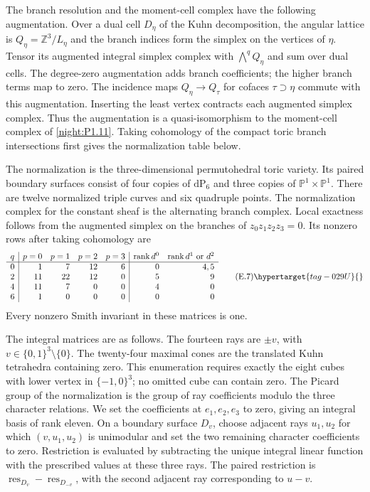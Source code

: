 \begin{remark}
\hypertarget{tag-PV08}{}\label{pub:V:cusp-branch-resolution}
The branch resolution and the moment-cell complex have the following
augmentation. Over a dual cell $D_\eta$ of the Kuhn decomposition,
the angular lattice is $Q_\eta=\mathbb Z^3/L_\eta$ and the branch
indices form the simplex on the vertices of $\eta$. Tensor its
augmented integral simplex complex with $\bigwedge^qQ_\eta$ and
sum over dual cells. The degree-zero augmentation adds branch
coefficients; the higher branch terms map to zero. The incidence
maps $Q_\eta\to Q_\tau$ for cofaces $\tau\supset\eta$ commute
with this augmentation. Inserting the least vertex contracts each
augmented simplex complex. Thus the augmentation is a
quasi-isomorphism to the moment-cell complex of
\cref{night:P1.11}. Taking cohomology of the compact toric branch
intersections first gives the normalization table below.

The normalization is the three-dimensional permutohedral toric variety.
Its paired boundary surfaces consist of four copies of $\mathrm{dP}_6$
and three copies of $\mathbb P^1\times\mathbb P^1$.  There are twelve
normalized triple curves and six quadruple points.  The normalization
complex for the constant sheaf is the alternating branch complex.
Local exactness follows from the augmented simplex on the branches
of $z_0z_1z_2z_3=0$.  Its nonzero rows after taking cohomology are
\[
\begin{array}{c|rrrr|rr}
q& p=0&p=1&p=2&p=3&\operatorname{rank}d^0&
 \operatorname{rank}d^1\ \text{or }d^2\\ \hline
0&1&7&12&6&0&4,5\\
2&11&22&12&0&5&9\\
4&11&7&0&0&4&0\\
6&1&0&0&0&0&0
\end{array}
\tag{E.7}\hypertarget{tag-029U}{}\label{maps:eq:E.7}
\]
Every nonzero Smith invariant in these matrices is one.


The integral matrices are as follows.
The fourteen rays are $\pm v$, with
$v\in\{0,1\}^3\setminus\{0\}$.  The twenty-four maximal cones
are the translated Kuhn tetrahedra containing zero.  This enumeration
requires exactly the eight cubes with lower vertex in $\{-1,0\}^3$;
no omitted cube can contain zero.  The Picard group of the normalization
is the group of ray coefficients modulo the three character relations.
We set the coefficients at $e_1,e_2,e_3$ to zero, giving an integral
basis of rank eleven.  On a boundary surface $D_v$, choose adjacent
rays $u_1,u_2$ for which $(v,u_1,u_2)$ is unimodular and set the two
remaining character coefficients to zero.  Restriction is evaluated
by subtracting the unique integral linear function with the prescribed
values at these three rays.  The paired restriction is
$\operatorname{res}_{D_v}-\operatorname{res}_{D_{-v}}$, with the
second adjacent ray corresponding to $u-v$.



\end{remark}
